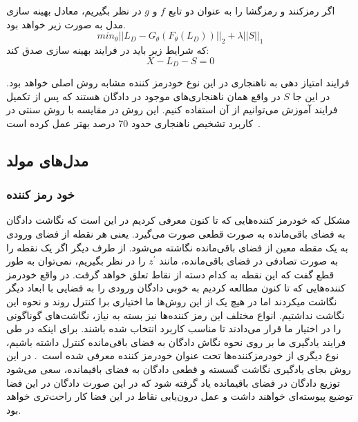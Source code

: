 \documentclass[12pt,a4paper]{report}
\theoremstyle{definition}
\theoremstyle{definition}
\begin{document}
اگر رمزکنند و رمزگشا را به عنوان دو تابع $f$ و $g$ در نظر بگیریم، معادل بهینه سازی مدل به صورت زیر خواهد بود.
\begin{equation}
	min_{\theta} || L_D - G_\theta(F_\theta(L_D)) ||_2 + \lambda ||S||_1
\end{equation}
که شرایط زیر باید در فرایند بهینه سازی صدق کند:
\begin{equation}
X-L_D-S=0
\end{equation}

فرایند امتیاز دهی به ناهنجاری در این نوع خودرمز کننده مشابه روش اصلی خواهد بود. در این جا $S$ در واقع همان ناهنجاری‌های موجود در دادگان هستند که پس از تکمیل فرایند آموزش می‌توانیم از آن استفاده کنیم. این روش در مقایسه با روش سنتی در کاربرد تشخیص ناهنجاری حدود 70 درصد بهتر عمل کرده است~\cite{10.1145/3097983.3098052}.

\subsection{مدل‌های مولد}

\subsubsection{ خود رمز کننده }
مشکل که خودرمز کننده‌هایی که تا کنون معرفی کردیم در این است که نگاشت دادگان به فضای باقی‌مانده به صورت قطعی صورت می‌گیرد. یعنی هر نقطه از فضای ورودی به یک مقطه معین از فضای باقی‌مانده نگاشته می‌شود. از طرف دیگر اگر یک نقطه را به صورت تصادفی در فضای باقی‌مانده، مانند 
$z^{'}$
 را در نظر بگیریم، نمی‌توان به طور قطع گفت که این نقطه به کدام دسته از نقاط تعلق خواهد گرفت. در واقع خودرمز کننده‌هایی که تا کنون مطالعه کردیم به خوبی دادگان ورودی را به فضایی با ابعاد دیگر نگاشت میکردند اما در هیچ یک از این روش‌ها ما اختیاری برا کنترل روند و نحوه این نگاشت نداشتیم. انواع مختلف این رمز کننده‌ها نیز بسته به نیاز، نگاشت‌های گوناگونی را در اختیار ما قرار می‌دادند تا مناسب کاربرد انتخاب شده باشند. برای اینکه در طی فرایند یادگیری ما بر روی نحوه نگاش دادگان به فضای باقی‌مانده کنترل داشته باشیم، نوع دیگری از خودرمزکننده‌ها تحت عنوان خودرمز کننده  معرفی شده است~\cite{vae}. در این روش بجای یادگیری نگاشت گسسته و قطعی دادگان به فضای باقیمانده، سعی می‌شود توزیع دادگان در فضای باقیمانده یاد گرفته شود که در این صورت دادگان در این فضا توضیع پیوسته‌ای خواهند داشت و عمل درون‌یابی نقاط در این فضا کار راحت‌تری خواهد بود.\\
\end{document}

